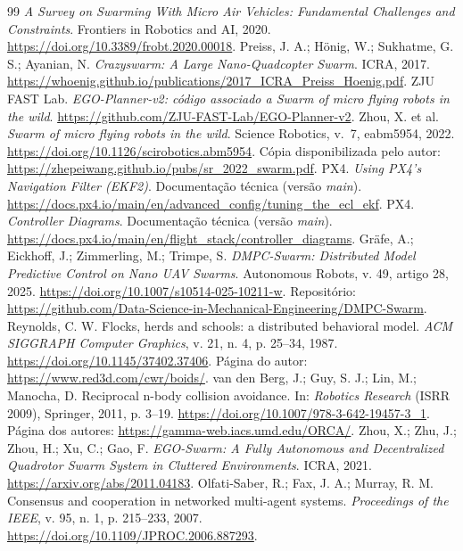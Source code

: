 \documentclass[11pt,a4paper,oneside]{book}
\numberwithin{equation}{chapter}
\begin{document}
\backmatter
\clearpage
{}
{}
\begin{thebibliography}{99}
\footnotesize
\setlength{\itemsep}{3pt}
 \emph{A Survey on Swarming With Micro Air Vehicles: Fundamental Challenges and Constraints}. Frontiers in Robotics and AI, 2020. \url{https://doi.org/10.3389/frobt.2020.00018}.
 Preiss, J. A.; Hönig, W.; Sukhatme, G. S.; Ayanian, N. \emph{Crazyswarm: A Large Nano-Quadcopter Swarm}. ICRA, 2017. \url{https://whoenig.github.io/publications/2017_ICRA_Preiss_Hoenig.pdf}.
 ZJU FAST Lab. \emph{EGO-Planner-v2: código associado a Swarm of micro flying robots in the wild}. \url{https://github.com/ZJU-FAST-Lab/EGO-Planner-v2}.
 Zhou, X. et al. \emph{Swarm of micro flying robots in the wild}. Science Robotics, v.~7, eabm5954, 2022. \url{https://doi.org/10.1126/scirobotics.abm5954}. Cópia disponibilizada pelo autor: \url{https://zhepeiwang.github.io/pubs/sr_2022_swarm.pdf}.
 PX4. \emph{Using PX4's Navigation Filter (EKF2)}. Documentação técnica (versão \emph{main}). \url{https://docs.px4.io/main/en/advanced_config/tuning_the_ecl_ekf}.
 PX4. \emph{Controller Diagrams}. Documentação técnica (versão \emph{main}). \url{https://docs.px4.io/main/en/flight_stack/controller_diagrams}.
 Gräfe, A.; Eickhoff, J.; Zimmerling, M.; Trimpe, S. \emph{DMPC-Swarm: Distributed Model Predictive Control on Nano UAV Swarms}. Autonomous Robots, v. 49, artigo 28, 2025. \url{https://doi.org/10.1007/s10514-025-10211-w}. Repositório: \url{https://github.com/Data-Science-in-Mechanical-Engineering/DMPC-Swarm}.
 Reynolds, C. W. Flocks, herds and schools: a distributed behavioral model. \emph{ACM SIGGRAPH Computer Graphics}, v. 21, n. 4, p. 25--34, 1987. \url{https://doi.org/10.1145/37402.37406}. Página do autor: \url{https://www.red3d.com/cwr/boids/}.
 van den Berg, J.; Guy, S. J.; Lin, M.; Manocha, D. Reciprocal n-body collision avoidance. In: \emph{Robotics Research} (ISRR 2009), Springer, 2011, p. 3--19. \url{https://doi.org/10.1007/978-3-642-19457-3_1}. Página dos autores: \url{https://gamma-web.iacs.umd.edu/ORCA/}.
 Zhou, X.; Zhu, J.; Zhou, H.; Xu, C.; Gao, F. \emph{EGO-Swarm: A Fully Autonomous and Decentralized Quadrotor Swarm System in Cluttered Environments}. ICRA, 2021. \url{https://arxiv.org/abs/2011.04183}.
 Olfati-Saber, R.; Fax, J. A.; Murray, R. M. Consensus and cooperation in networked multi-agent systems. \emph{Proceedings of the IEEE}, v. 95, n. 1, p. 215--233, 2007. \url{https://doi.org/10.1109/JPROC.2006.887293}.

\end{thebibliography}
\end{document}
